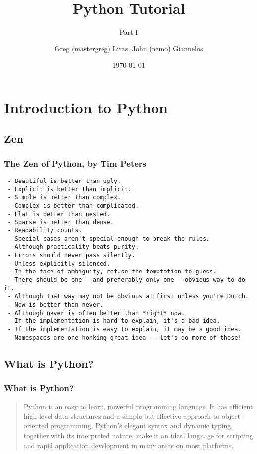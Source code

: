 \documentclass{beamer}
\author[nemo,mastergreg]{Greg (mastergreg) Liras, John (nemo) Giannelos}
\institute{foss.ntua}
\title{Python Tutorial}
\subtitle{Part I}
\date{\today}
\begin{document}
\begin{frame}
    \titlepage
\end{frame}


\section{Introduction to Python}

\subsection{Zen}
\begin{frame}[fragile]
    \frametitle{The Zen of Python, by Tim Peters}
    \begin{verbatim}
 - Beautiful is better than ugly.
 - Explicit is better than implicit.
 - Simple is better than complex.
 - Complex is better than complicated.
 - Flat is better than nested.
 - Sparse is better than dense.
 - Readability counts.
 - Special cases aren't special enough to break the rules.
 - Although practicality beats purity.
 - Errors should never pass silently.
 - Unless explicitly silenced.
 - In the face of ambiguity, refuse the temptation to guess.
 - There should be one-- and preferably only one --obvious way to do it.
 - Although that way may not be obvious at first unless you're Dutch.
 - Now is better than never.
 - Although never is often better than *right* now.
 - If the implementation is hard to explain, it's a bad idea.
 - If the implementation is easy to explain, it may be a good idea.
 - Namespaces are one honking great idea -- let's do more of those!
    \end{verbatim}

\end{frame}
\subsection{What is Python?}
\begin{frame}
    \frametitle{What is Python?}
    \begin{quote}
        Python is an easy to learn, powerful programming language. It has efficient
        high-level data structures and a simple but effective approach to
        object-oriented programming. Python’s elegant syntax and dynamic typing,
        together with its interpreted nature, make it an ideal language for scripting
        and rapid application development in many areas on most platforms.
    \end{quote}
\end{frame}
\end{document}
